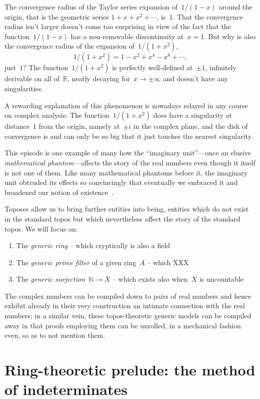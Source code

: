 \documentclass[10pt,reqno,a4paper,openany]{amsbook}
\theoremstyle{definition}
\theoremstyle{plain}
\theoremstyle{remark}
\newcommand{\NN}{\mathbb{N}}
\newcommand{\RR}{\mathbb{R}}
\newcommand{\?}{\,{:}\,}
\renewcommand{\_}{\mathpunct{.}\,}
\begin{document}
The convergence radius of the Taylor series expansion of~$1/(1-x)$ around the
origin, that is the geometric series
$1 + x + x^2 + \cdots$,
is~$1$. That the convergence radius isn't larger doesn't come too surprising in
view of the fact that the function~$1/(1-x)$ has a non-removable discontinuity
at~$x = 1$. But why is also the convergence radius of the expansion
of~$1/(1+x^2)$,
\[ 1/(1+x^2) = 1 - x^2 + x^4 - x^6 + \cdots, \]
just~$1$? The function~$1/(1+x^2)$ is
perfectly well-defined at~$\pm 1$, infinitely derivable on all of~$\RR$, neatly
decaying for~$x \to \pm\infty$ and doesn't have any singularities.

A rewarding explanation of this phenomenon is nowadays relayed in any course on
complex analysis: The function~$1/(1+x^2)$ does have a singularity at
distance~$1$ from the origin, namely at~$\pm i$ in the complex plane, and the disk
of convergence is and can only be so big that it just touches the nearest singularity.

This episode is one example of many how the ``imaginary unit''---once
an elusive \emph{mathematical phantom}---affects the story of the real numbers even
though it itself is not one of them. Like many mathematical phantoms before it,
the imaginary unit obtruded its effects so convincingly that eventually we
embraced it and broadened our notion of existence~\cite{wraith:phantoms}.

Toposes allow us to bring further entities into being, entities which do not
exist in the standard topos but which nevertheless affect the story of the
standard topos. We will focus on:
\begin{enumerate}
\item The \emph{generic ring} -- which cryptically is also a field
\item The \emph{generic prime filter} of a given ring~$A$ -- which
XXX
\item The \emph{generic surjection}~$\NN \to X$ -- which exists also when~$X$
is uncountable
\end{enumerate}
The complex numbers can be compiled down to pairs of real numbers and hence
exhibit already in their very construction an intimate connection with the real
numbers; in a similar vein, these topos-theoretic generic models can be
compiled away in that proofs employing them can be unrolled, in a mechanical
fashion even, so as to not mention them.


\section{Ring-theoretic prelude: the method of indeterminates}
\label{sect:indeterminates}
\end{document}
